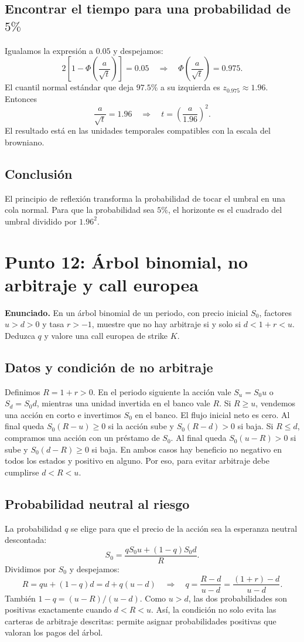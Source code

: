 \documentclass[11pt, a4paper]{article}
\begin{document}
\subsection*{Encontrar el tiempo para una probabilidad de \(5\%\)}
Igualamos la expresión a \(0.05\) y despejamos:
\[
2\left[1-\Phi\left(\frac{a}{\sqrt t}\right)\right]=0.05
\quad\Longrightarrow\quad
\Phi\left(\frac{a}{\sqrt t}\right)=0.975.
\]
El cuantil normal estándar que deja \(97.5\%\) a su izquierda es \(z_{0.975}\approx1.96\). Entonces
\[
\frac{a}{\sqrt t}=1.96
\quad\Longrightarrow\quad
\boxed{t=\left(\frac{a}{1.96}\right)^2}.
\]
El resultado está en las unidades temporales compatibles con la escala del browniano.

\subsection*{Conclusión}
El principio de reflexión transforma la probabilidad de tocar el umbral en una cola normal. Para que la probabilidad sea \(5\%\), el horizonte es el cuadrado del umbral dividido por \(1.96^2\).

\newpage
\section*{Punto 12: Árbol binomial, no arbitraje y call europea}
\textbf{Enunciado.} En un árbol binomial de un periodo, con precio inicial \(S_0\), factores \(u>d>0\) y tasa \(r>-1\), muestre que no hay arbitraje si y solo si \(d<1+r<u\). Deduzca \(q\) y valore una call europea de strike \(K\).

\subsection*{Datos y condición de no arbitraje}
Definimos \(R=1+r>0\). En el periodo siguiente la acción vale \(S_u=S_0u\) o \(S_d=S_0d\), mientras una unidad invertida en el banco vale \(R\).
Si \(R\ge u\), vendemos una acción en corto e invertimos \(S_0\) en el banco. El flujo inicial neto es cero. Al final queda \(S_0(R-u)\ge0\) si la acción sube y \(S_0(R-d)>0\) si baja. Si \(R\le d\), compramos una acción con un préstamo de \(S_0\). Al final queda \(S_0(u-R)>0\) si sube y \(S_0(d-R)\ge0\) si baja. En ambos casos hay beneficio no negativo en todos los estados y positivo en alguno. Por eso, para evitar arbitraje debe cumplirse \(d<R<u\).

\subsection*{Probabilidad neutral al riesgo}
La probabilidad \(q\) se elige para que el precio de la acción sea la esperanza neutral descontada:
\[
S_0=\frac{qS_0u+(1-q)S_0d}{R}.
\]
Dividimos por \(S_0\) y despejamos:
\[
R=qu+(1-q)d=d+q(u-d)
\quad\Longrightarrow\quad
\boxed{q=\frac{R-d}{u-d}=\frac{(1+r)-d}{u-d}}.
\]
También \(1-q=(u-R)/(u-d)\). Como \(u>d\), las dos probabilidades son positivas exactamente cuando \(d<R<u\). Así, la condición no solo evita las carteras de arbitraje descritas: permite asignar probabilidades positivas que valoran los pagos del árbol.
\end{document}
